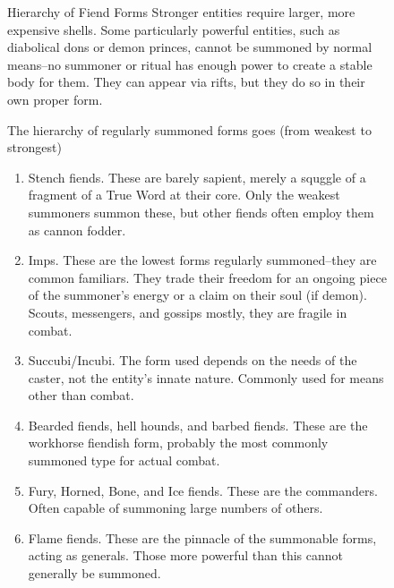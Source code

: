 \begin{figure}
	\begin{DndComment}{Hierarchy of Fiend Forms}
		Stronger entities require larger, more expensive shells. Some particularly powerful entities, such as diabolical dons or demon princes, cannot be summoned by normal means--no summoner or ritual has enough power to create a stable body for them. They can appear via rifts, but they do so in their own proper form.

		The hierarchy of regularly summoned forms goes (from weakest to strongest)
		\begin{enumerate}
			\item Stench fiends. These are barely sapient, merely a squggle of a fragment of a True Word at their core. Only the weakest summoners summon these, but other fiends often employ them as cannon fodder.
			\item Imps. These are the lowest forms regularly summoned--they are common familiars. They trade their freedom for an ongoing piece of the summoner's energy or a claim on their soul (if demon). Scouts, messengers, and gossips mostly, they are fragile in combat.
			\item Succubi/Incubi. The form used depends on the needs of the caster, not the entity's innate nature. Commonly used for means other than combat.
			\item Bearded fiends, hell hounds, and barbed fiends. These are the workhorse fiendish form, probably the most commonly summoned type for actual combat.
			\item Fury, Horned, Bone, and Ice fiends. These are the commanders. Often capable of summoning large numbers of others.
			\item Flame fiends. These are the pinnacle of the summonable forms, acting as generals. Those more powerful than this cannot generally be summoned.
		\end{enumerate}
	\end{DndComment}
\end{figure}

